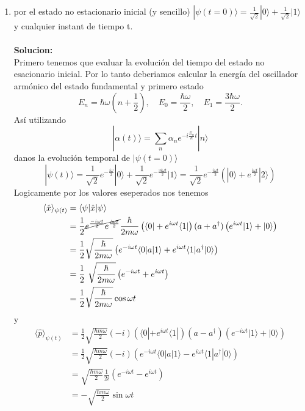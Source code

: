 \begin{enumerate}
\item por el estado no estacionario inicial (y sencillo) $|\psi(t=0)\rangle =
\frac{1}{\sqrt{2}} |0\rangle + \frac{1}{\sqrt{2}} | 1 \rangle$ y cualquier
instant de tiempo t. \\\\
\textbf{Solucion:} \\
Primero tenemos que evaluar la evolución del tiempo del estado no esacionario
inicial. Por lo tanto deberiamos calcular la energía del oscillador armónico
del estado fundamental y primero estado
\begin{equation*}
	E_n = \hbar \omega (n + \frac{1}{2}), \quad E_0 = \frac{\hbar \omega}{2}
,\quad E_1 = \frac{3 \hbar \omega}{2}.
\end{equation*}
Así utilizando
\begin{equation*}
	|\alpha (t)\rangle = \sum_n \alpha_n e^{-i\frac{E_n}{\hbar} t} | n\rangle
\end{equation*}
danos la evolución temporal de $|\psi(t=0)\rangle$ 
\begin{equation*}
	|\psi(t)\rangle = \frac{1}{\sqrt{2}} e^{-\frac{i\omega}{2}}|0\rangle
+ \frac{1}{\sqrt{2}} e^{-\frac{3 i \omega t}{2}} |1 \rangle  = \frac{1}{\sqrt{2}}
e^{-\frac{i\omega t}{2}} \left( |0\rangle + e^{\frac{i \omega t}{2}} |
2\rangle \right)
\end{equation*}
Logicamente por los valores eseperados nos tenemos
\begin{align*}
	\langle \hat x \rangle_{\psi(t)} &= \langle \psi | \hat x | \psi \rangle \\
	&= \frac{1}{2} \cancel{e^{\frac{- i \omega t}{2}}e^{\frac{i \omega t}{2}}}
\frac{\hbar}{2m\omega} \left( \langle 0| + e^{i\omega t} \langle 1 | \right) ( a +
a^\dagger) \left( e^{i\omega t} | 1 \rangle + | 0 \rangle \right) \\
	&= \frac{1}{2} \sqrt{\frac{\hbar}{2m\omega}} \left( e^{-i\omega t}\langle 0
| a | 1 \rangle + e^{i\omega t} \langle 1 | a^\dagger | 0 \rangle \right) \\
	&= \frac{1}{2} \sqrt{\frac{\hbar}{2m\omega}} \left( e^{-i\omega t} + e^{i
\omega t} \right) \\
	&= \frac{1}{2} \sqrt{\frac{\hbar}{2m\omega}} \cos{\omega t}  
\end{align*}
y 
\begin{align*}
	\langle \hat p \rangle_{\psi(t)} &= \frac{1}{2} \sqrt{\frac{\hbar m
\omega}{2}} (-i) \left( \langle 0| + e^{i\omega t} \langle 1| \right) (a -
a^\dagger) \left( e^{-i\omega t} |1\rangle + |0\rangle \right) \\
	&= \frac{1}{2} \sqrt{\frac{\hbar m \omega}{2}} (-i) \left( e^{-i\omega
t}\langle 0 | a | 1 \rangle - e^{i\omega t} \langle 1| a^\dagger | 0 \rangle
\right) \\
	&= \sqrt{\frac{\hbar m \omega}{2}} \frac{1}{2i}\left( e^{-i\omega t} -
e^{i \omega t} \right) \\
	&= -\sqrt{\frac{\hbar m \omega}{2}} \sin{\omega t}  
\end{align*}


\end{enumerate}
